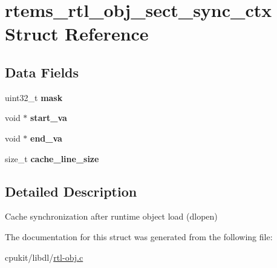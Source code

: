 \hypertarget{structrtems__rtl__obj__sect__sync__ctx}{}\section{rtems\+\_\+rtl\+\_\+obj\+\_\+sect\+\_\+sync\+\_\+ctx Struct Reference}
\label{structrtems__rtl__obj__sect__sync__ctx}
\subsection*{Data Fields}
\begin{DoxyCompactItemize}
\item 
\mbox{\label{structrtems__rtl__obj__sect__sync__ctx_a690e9e35a5e6e2712e08ed005bb2a371}} 
uint32\+\_\+t {\bfseries mask}
\item 
\mbox{\label{structrtems__rtl__obj__sect__sync__ctx_a7f2820df1531eb4f508691feca1c2cab}} 
void $\ast$ {\bfseries start\+\_\+va}
\item 
\mbox{\label{structrtems__rtl__obj__sect__sync__ctx_af5e7d7012e974a7f4ee9383d656f749f}} 
void $\ast$ {\bfseries end\+\_\+va}
\item 
\mbox{\label{structrtems__rtl__obj__sect__sync__ctx_a7130fa7e856026a5c8ba7b5469e72173}} 
size\+\_\+t {\bfseries cache\+\_\+line\+\_\+size}
\end{DoxyCompactItemize}


\subsection{Detailed Description}
Cache synchronization after runtime object load (dlopen) 

The documentation for this struct was generated from the following file\+:\begin{DoxyCompactItemize}
\item 
cpukit/libdl/\mbox{\hyperlink{rtl-obj_8c}{rtl-\/obj.\+c}}\end{DoxyCompactItemize}
